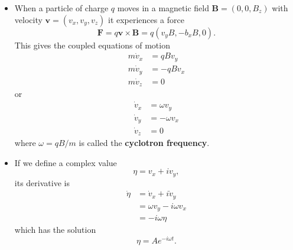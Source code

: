 \documentclass{article}
\renewcommand{\vec}[1]{\boldsymbol{\mathbf{#1}}}
\begin{document}
\begin{itemize}
  \item When a particle of charge $q$ moves in a magnetic field $\vec{B} = (0, 0, B_z)$ with velocity $\vec{v} = (v_x, v_y, v_z)$ it experiences a force \[\vec{F} = q \vec{v} \times \vec{B} = q (v_y B, -b_x B, 0).\] This gives the coupled equations of motion \begin{align*}
          m \dot{v}_x & = q B v_y  \\
          m \dot{v}_y & = -q B v_x \\
          m \dot{v}_z & = 0
        \end{align*} or \begin{align*}
          \dot{v}_x & = \omega v_y  \\
          \dot{v}_y & = -\omega v_x \\
          \dot{v}_z & = 0
        \end{align*} where $\omega = q B / m$ is called the \textbf{cyclotron frequency}.

  \item If we define a complex value \[\eta = v_x + i v_y,\] its derivative is \begin{align*}
          \dot{\eta} & = \dot{v}_x + i \dot{v}_y   \\
                     & = \omega v_y - i \omega v_x \\
                     & = -i \omega \eta
        \end{align*} which has the solution \[\eta = A e^{-i \omega t}.\]
\end{itemize}
\end{document}
